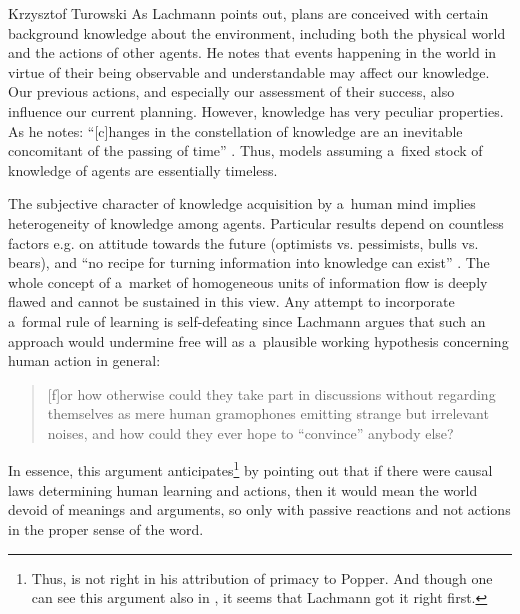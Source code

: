 \begin{artengenv}{Krzysztof Turowski}
As Lachmann points out, plans are conceived with certain background knowledge about the environment, including both the physical world and the actions of other agents.
He notes that events happening in the world in virtue of their being observable and understandable may affect our knowledge.
Our previous actions, and especially our assessment of their success, also influence our current planning.
However, knowledge has very peculiar properties. As he notes: ``[c]hanges in the constellation of knowledge are an inevitable concomitant of the passing of time'' \parencite[200]{lachmann-hayek}.
Thus, models assuming a~fixed stock of knowledge of agents are essentially timeless.

The subjective character of knowledge acquisition by a~human mind implies heterogeneity of knowledge among agents.
Particular results depend on countless factors e.g. on attitude towards the future (optimists vs. pessimists, bulls vs. bears), and ``no recipe for turning information into knowledge can exist'' \parencite[51]{lachmann1986market}.
The whole concept of a~market of homogeneous units of information flow is deeply flawed and cannot be sustained in this view.
Any attempt to incorporate a~formal rule of learning is self-defeating since Lachmann argues that such an approach would undermine free will as a~plausible working hypothesis concerning human action in general:
\begin{quote}
[f]or how otherwise could they take part in discussions without regarding themselves as mere human gramophones emitting strange but irrelevant noises, and how could they ever hope to ``convince'' anybody else? \parencite[167]{lachmann-science}
\end{quote}
In essence, this argument anticipates\footnote{Thus, \textcite[38]{hoppe} is not right in his attribution of primacy to Popper. And though one can see this argument also in \textcite[104]{shackle-time}, it seems that Lachmann got it right first.} \textcite[10]{popper-poverty} by pointing out that if there were causal laws determining human learning and actions, then it would mean the world devoid of meanings and arguments, so only with passive reactions and not actions in the proper sense of the word.


\end{artengenv}
